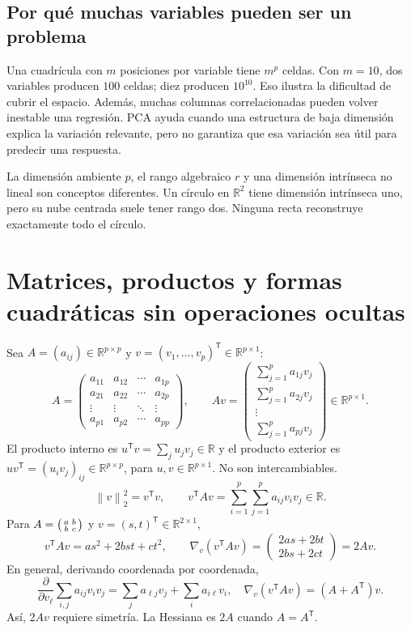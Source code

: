 \documentclass[11pt,a4paper]{article}
\newcommand{\R}{\mathbb R}
\newcommand{\T}{^{\mathsf T}}
\newcommand{\norm}[1]{\left\lVert #1\right\rVert}
\theoremstyle{definition}
\begin{document}
\subsection{Por qué muchas variables pueden ser un problema}
Una cuadrícula con $m$ posiciones por variable tiene $m^p$ celdas. Con $m=10$, dos variables producen $100$ celdas; diez producen $10^{10}$. Eso ilustra la dificultad de cubrir el espacio. Además, muchas columnas correlacionadas pueden volver inestable una regresión. PCA ayuda cuando una estructura de baja dimensión explica la variación relevante, pero no garantiza que esa variación sea útil para predecir una respuesta.
\begin{cuidado}
La dimensión ambiente $p$, el rango algebraico $r$ y una dimensión intrínseca no lineal son conceptos diferentes. Un círculo en $\R^2$ tiene dimensión intrínseca uno, pero su nube centrada suele tener rango dos. Ninguna recta reconstruye exactamente todo el círculo.
\end{cuidado}

\section{Matrices, productos y formas cuadráticas sin operaciones ocultas}
Sea $A=(a_{ij})\in\R^{p\times p}$ y $v=(v_1,\ldots,v_p)\T\in\R^{p\times1}$:
\[
A=\begin{pmatrix}a_{11}&a_{12}&\cdots&a_{1p}\\a_{21}&a_{22}&\cdots&a_{2p}\\\vdots&\vdots&\ddots&\vdots\\a_{p1}&a_{p2}&\cdots&a_{pp}\end{pmatrix},\qquad
Av=\begin{pmatrix}\sum_{j=1}^pa_{1j}v_j\\\sum_{j=1}^pa_{2j}v_j\\\vdots\\\sum_{j=1}^pa_{pj}v_j\end{pmatrix}\in\R^{p\times1}.
\]
El producto interno es $u\T v=\sum_j u_jv_j\in\R$ y el producto exterior es $uv\T=(u_iv_j)_{ij}\in\R^{p\times p}$, para $u,v\in\R^{p\times1}$. No son intercambiables.
\[
\norm v_2^2=v\T v,\qquad v\T Av=\sum_{i=1}^p\sum_{j=1}^pa_{ij}v_iv_j\in\R.
\]
Para $A=\begin{psmallmatrix}a&b\\b&c\end{psmallmatrix}$ y $v=(s,t)\T\in\R^{2\times1}$,
\[
v\T Av=as^2+2bst+ct^2,\qquad
\nabla_v(v\T Av)=\begin{pmatrix}2as+2bt\\2bs+2ct\end{pmatrix}=2Av.
\]
En general, derivando coordenada por coordenada,
\[
\frac{\partial}{\partial v_\ell}\sum_{i,j}a_{ij}v_iv_j
=\sum_j a_{\ell j}v_j+\sum_i a_{i\ell}v_i,
\quad \nabla_v(v\T Av)=(A+A\T)v.
\]
Así, $2Av$ requiere simetría. La Hessiana es $2A$ cuando $A=A\T$.
\end{document}
